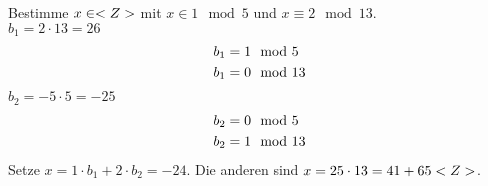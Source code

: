 \begin{example}
	Bestimme $x \in <Z>$ mit $x \in 1 \mod 5$ und $x \equiv 2 \mod 13$.\\
	$b_1 = 2 \cdot 13 = 26$
	\begin{align}
		b_1 &= 1 \mod 5 \notag \\
		b_1 &= 0 \mod 13\notag 
	\end{align}
	$b_2 = -5\cdot 5 = -25$
	\begin{align}
		b_2 &= 0 \mod 5\notag \\
		b_2 &= 1 \mod 13\notag
	\end{align}
	Setze $x = 1\cdot b_1 + 2 \cdot b_2 = -24$. Die anderen sind $x = 25\cdot 13 = 41 + 65<Z>$. %
\end{example}